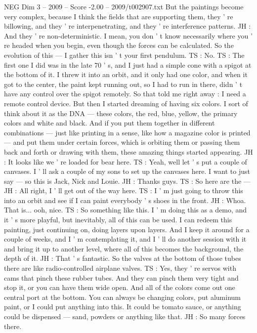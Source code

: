 \begin{textsample}{NEG Dim 3 – 2009 – Score -2.00 – 2009/t002907.txt}
But the paintings become very complex, because I think the fields that are supporting them, they ' re billowing, and they ' re interpenetrating, and they ' re interference patterns.
JH : And they ' re non-deterministic.
I mean, you don ' t know necessarily where you ' re headed when you begin, even though the forces can be calculated.
So the evolution of this — I gather this isn ' t your first pendulum.
TS : No.
TS : The first one I did was in the late 70 ' s, and I just had a simple cone with a spigot at the bottom of it.
I threw it into an orbit, and it only had one color, and when it got to the center, the paint kept running out, so I had to run in there, didn ' t have any control over the spigot remotely.
So that told me right away : I need a remote control device.
But then I started dreaming of having six colors.
I sort of think about it as the DNA — these colors, the red, blue, yellow, the primary colors and white and black.
And if you put them together in different combinations — just like printing in a sense, like how a magazine color is printed — and put them under certain forces, which is orbiting them or passing them back and forth or drawing with them, these amazing things started appearing.
JH : It looks like we ' re loaded for bear here.
TS : Yeah, well let ' s put a couple of canvases.
I ' ll ask a couple of my sons to set up the canvases here.
I want to just say — so this is Jack, Nick and Louie.
JH : Thanks guys.
TS : So here are the — JH : All right, I ' ll get out of the way here.
TS : I ' m just going to throw this into an orbit and see if I can paint everybody ' s shoes in the front.
JH : Whoa.
That is... ooh, nice.
TS : So something like this.
I ' m doing this as a demo, and it ' s more playful, but inevitably, all of this can be used.
I can redeem this painting, just continuing on, doing layers upon layers.
And I keep it around for a couple of weeks, and I ' m contemplating it, and I ' ll do another session with it and bring it up to another level, where all of this becomes the background, the depth of it.
JH : That ' s fantastic.
So the valves at the bottom of those tubes there are like radio-controlled airplane valves.
TS : Yes, they ' re servos with cams that pinch these rubber tubes.
And they can pinch them very tight and stop it, or you can have them wide open.
And all of the colors come out one central port at the bottom.
You can always be changing colors, put aluminum paint, or I could put anything into this.
It could be tomato sauce, or anything could be dispensed — sand, powders or anything like that.
JH : So many forces there.

\end{textsample}
